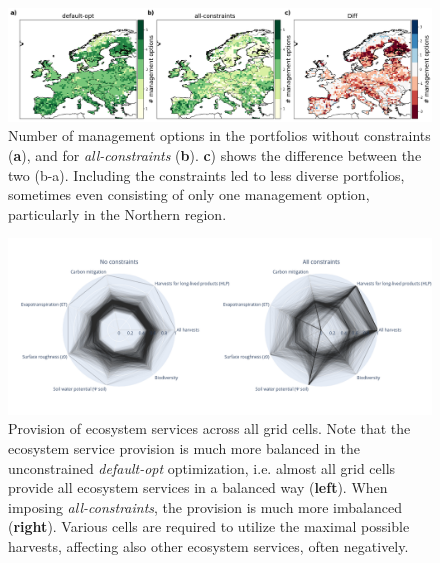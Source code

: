 \documentclass[]{article}
\begin{document}
\begin{figure}[h!]
	\centering
	\includegraphics[width=\linewidth]{paper_figs/less_diverse_portfolios.png}
	\caption{Number of management options in the portfolios without constraints (\textbf{a}), and for \textit{all-constraints} (\textbf{b}). \textbf{c}) shows the difference between the two (b-a). Including the constraints led to less diverse portfolios, sometimes even consisting of only one management option, particularly in the Northern region.}
	\label{fig:portfolios-harv-constrained-detailed}
\end{figure}






\begin{figure}[h!]
	\centering
	\includegraphics[width=0.8\linewidth]{paper_figs/all_cells_es_provision.png}
	\caption{Provision of ecosystem services across all grid cells. Note that the ecosystem service provision is much more balanced in the unconstrained \textit{default-opt} optimization, i.e. almost all grid cells provide all ecosystem services in a balanced way (\textbf{left}). When imposing \textit{all-constraints}, the provision is much more imbalanced (\textbf{right}). Various cells are required to utilize the maximal possible harvests, affecting also other ecosystem services, often negatively.}
	\label{fig:es-provision-all}
\end{figure}
\end{document}
